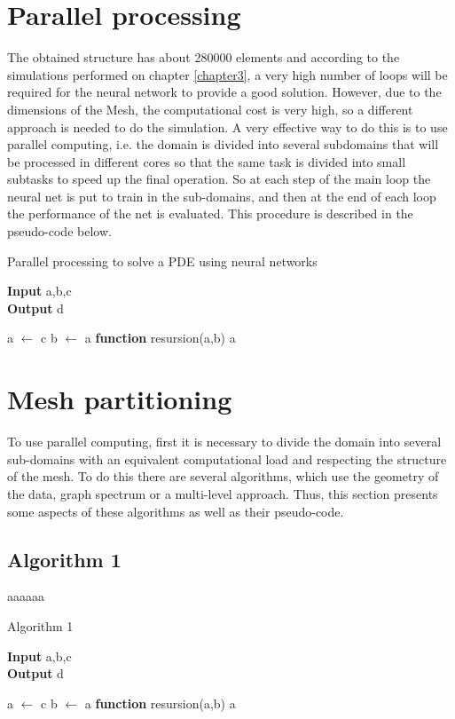 \section{Parallel processing}
The obtained structure has about 280000 elements and according to the simulations performed on chapter \ref{chapter3}, a very high number of loops will be required for the neural network to provide a good solution. However, due to the dimensions of the Mesh, the computational cost is very high, so a different approach is needed to do the simulation.
A very effective way to do this is to use parallel computing, i.e. the domain is divided into several subdomains that will be processed in different cores so that the same task is divided into small subtasks to speed up the final operation. 
So at each step of the main loop the neural net is put to train in the sub-domains, and then at the end of each loop the performance of the net is evaluated.
This procedure is described in the pseudo-code below.
\begin{algorithm}[H]
    \caption*{Parallel processing to solve a PDE using neural networks}
    \hspace*{\algorithmicindent} \textbf{Input} a,b,c\\
    \hspace*{\algorithmicindent} \textbf{Output} d
    \begin{algorithmic}
    \STATE a $\leftarrow$ c
    \STATE b $\leftarrow$ a
    \STATE \textbf{function} \quad resursion(a,b)
        \bindent
        \RETURN a
        \eindent
    \end{algorithmic}
    \end{algorithm}

\section{Mesh partitioning}
To use parallel computing, first it is necessary to divide the domain into several sub-domains with an equivalent computational load and respecting the structure of the mesh. To do this there are several algorithms, which use the geometry of the data, graph spectrum or a multi-level approach.
Thus, this section presents some aspects of these algorithms as well as their pseudo-code.

\subsection{Algorithm 1}
aaaaaa
\begin{algorithm}[H]
    \caption*{Algorithm 1}
    \hspace*{\algorithmicindent} \textbf{Input} a,b,c\\
    \hspace*{\algorithmicindent} \textbf{Output} d
    \begin{algorithmic}
    \STATE a $\leftarrow$ c
    \STATE b $\leftarrow$ a
    \STATE \textbf{function} \quad resursion(a,b)
        \bindent
        \RETURN a
        \eindent
    \end{algorithmic}
    \end{algorithm}

